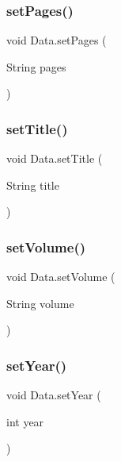 \hypertarget{class_data_a368b24c15d79a0ec0c33f031f489d616}{}\label{class_data_a368b24c15d79a0ec0c33f031f489d616} 
\subsubsection{\texorpdfstring{set\+Pages()}{setPages()}}
{\footnotesize\ttfamily void Data.\+set\+Pages (\begin{DoxyParamCaption}\item[{String}]{pages }\end{DoxyParamCaption})}

\hypertarget{class_data_a4efe69d1a38809de935950b0c344ac94}{}\label{class_data_a4efe69d1a38809de935950b0c344ac94} 
\subsubsection{\texorpdfstring{set\+Title()}{setTitle()}}
{\footnotesize\ttfamily void Data.\+set\+Title (\begin{DoxyParamCaption}\item[{String}]{title }\end{DoxyParamCaption})}

\hypertarget{class_data_a7112127b737cbae7671940486a3a2f2f}{}\label{class_data_a7112127b737cbae7671940486a3a2f2f} 
\subsubsection{\texorpdfstring{set\+Volume()}{setVolume()}}
{\footnotesize\ttfamily void Data.\+set\+Volume (\begin{DoxyParamCaption}\item[{String}]{volume }\end{DoxyParamCaption})}

\hypertarget{class_data_a03a832c4735f73cf7ffd55ab0261c1aa}{}\label{class_data_a03a832c4735f73cf7ffd55ab0261c1aa} 
\subsubsection{\texorpdfstring{set\+Year()}{setYear()}}
{\footnotesize\ttfamily void Data.\+set\+Year (\begin{DoxyParamCaption}\item[{int}]{year }\end{DoxyParamCaption})}

